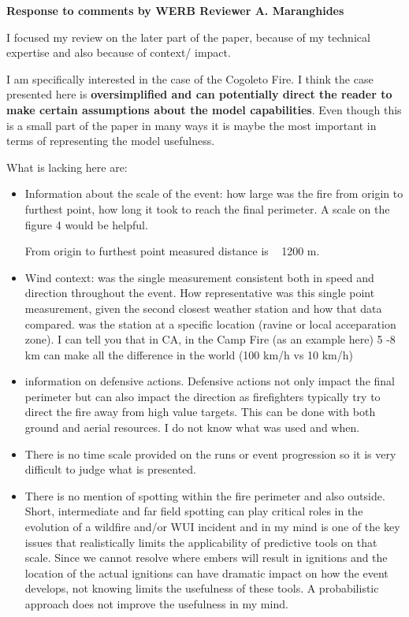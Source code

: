 \documentclass[12pt]{article}
\begin{document}
\begin{center}
{\bf Response to comments by WERB Reviewer A. Maranghides}
\end{center}

I focused my review on the later part of the paper, because of my technical expertise and also because of context/ impact.

I am specifically interested in the case of the Cogoleto Fire. I think the case presented here is \textbf{oversimplified and can potentially direct the reader to make certain assumptions about the model capabilities}. Even though this is a small part of the paper in many ways it is maybe the most important in terms of representing the model usefulness.

What is lacking here are:
%
\begin{itemize}
   
   \item Information about the scale of the event: how large was the fire from origin to furthest point, how long it took to reach the final perimeter. A scale on the figure 4 would be helpful. 
   
   From origin to furthest point measured distance is ~ 1200 m.  
   
   
   \item Wind context: was the single measurement consistent both in speed and direction throughout the event. How representative was this single point measurement, given the second closest weather station and how that data compared. was the station at a specific location (ravine or local acceparation zone). I can tell you that in CA, in the Camp Fire (as an example here) 5 -8 km can make all the difference in the world (100 km/h vs 10 km/h)
   
   
   
   \item information on defensive actions. Defensive actions not only impact the final perimeter but can also impact the direction as firefighters typically try to direct the fire away from high value targets. This can be done with both ground and aerial resources. I do not know what was used and when.



   \item There is no time scale provided on the runs or event progression so it is very difficult to judge what is presented.

   \item There is no mention of spotting within the fire perimeter and also outside. Short, intermediate and far field spotting can play critical roles in the evolution of a wildfire and/or WUI incident and in my mind is one of the key issues that realistically limits the applicability of predictive tools on that scale. Since we cannot resolve where embers will result in ignitions and the location of the actual ignitions can have dramatic impact on how the event develops, not knowing limits the usefulness of these tools. A probabilistic approach does not improve the usefulness in my mind.


\end{itemize}
\end{document}
